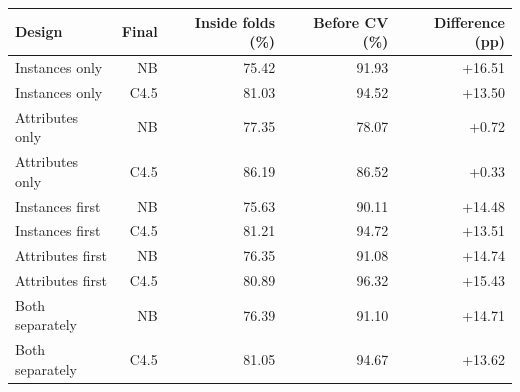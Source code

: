 \begin{tabular}{lrrrr}
\toprule
Design & Final & Inside folds (\%) & Before CV (\%) & Difference (pp) \\
\midrule
Instances only & NB & 75.42 & 91.93 & +16.51 \\
Instances only & C4.5 & 81.03 & 94.52 & +13.50 \\
Attributes only & NB & 77.35 & 78.07 & +0.72 \\
Attributes only & C4.5 & 86.19 & 86.52 & +0.33 \\
Instances first & NB & 75.63 & 90.11 & +14.48 \\
Instances first & C4.5 & 81.21 & 94.72 & +13.51 \\
Attributes first & NB & 76.35 & 91.08 & +14.74 \\
Attributes first & C4.5 & 80.89 & 96.32 & +15.43 \\
Both separately & NB & 76.39 & 91.10 & +14.71 \\
Both separately & C4.5 & 81.05 & 94.67 & +13.62 \\
\bottomrule
\end{tabular}
